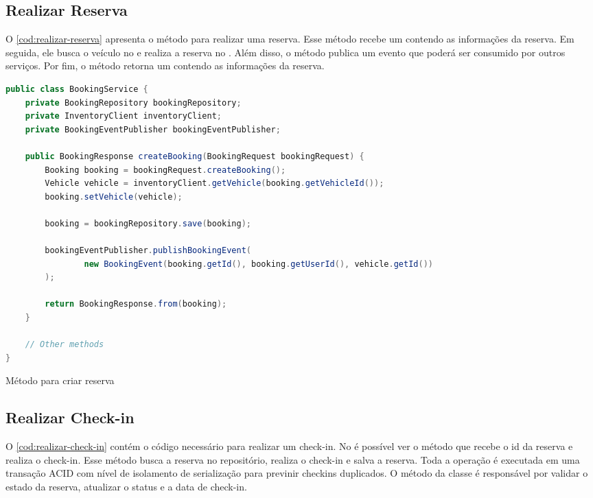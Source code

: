 \subsection{Realizar Reserva}
O \autoref{cod:realizar-reserva} apresenta o método para realizar uma reserva. Esse método recebe um  contendo as informações da reserva. Em seguida, ele busca o veículo no  e realiza a reserva no . Além disso, o método publica um evento que poderá ser consumido por outros serviços. Por fim, o método retorna um  contendo as informações da reserva.

\begin{codigo}[H]
    \begin{lstlisting}[language=Java]
public class BookingService {
    private BookingRepository bookingRepository;
    private InventoryClient inventoryClient;
    private BookingEventPublisher bookingEventPublisher;

    public BookingResponse createBooking(BookingRequest bookingRequest) {
        Booking booking = bookingRequest.createBooking();
        Vehicle vehicle = inventoryClient.getVehicle(booking.getVehicleId());
        booking.setVehicle(vehicle);

        booking = bookingRepository.save(booking);

        bookingEventPublisher.publishBookingEvent(
                new BookingEvent(booking.getId(), booking.getUserId(), vehicle.getId())
        );

        return BookingResponse.from(booking);
    }

    // Other methods
}
    \end{lstlisting}
    \caption{Método para criar reserva}
    \label{cod:realizar-reserva}
\end{codigo}

\subsection{Realizar Check-in}
O \autoref{cod:realizar-check-in} contém o código necessário para realizar um check-in. No  é possível ver o método  que recebe o id da reserva e realiza o check-in. Esse método busca a reserva no repositório, realiza o check-in e salva a reserva. Toda a operação é executada em uma transação ACID com nível de isolamento de serialização para previnir checkins duplicados. O método  da classe  é responsável por validar o estado da reserva, atualizar o status e a data de check-in.

